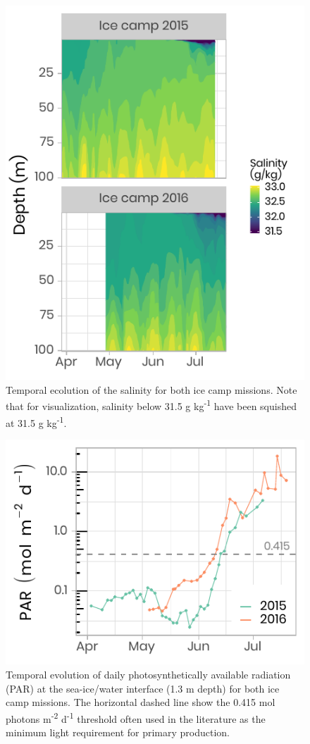 \documentclass[12pt,a4paper]{scrartcl}
\begin{document}
\begin{figure}[h]
	\centering
	\includegraphics[scale = 2]{../../../graphs/fig3.pdf}
	\caption{Temporal ecolution of the salinity for both ice camp missions. Note that for visualization, salinity below 31.5 g kg\textsuperscript{-1} have been squished at 31.5 g kg\textsuperscript{-1}.}
\end{figure}

\begin{figure}[h]
	\centering
	\includegraphics[scale = 2]{../../../graphs/fig4.pdf}
	\caption{Temporal evolution of daily photosynthetically available radiation (PAR) at the sea-ice/water interface (1.3 m depth) for both ice camp missions. The horizontal dashed line show the 0.415 mol photons m\textsuperscript{-2} d\textsuperscript{-1} threshold often used in the literature as the minimum light requirement for primary production.}
\end{figure}
\end{document}
